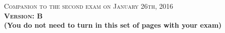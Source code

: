\documentclass{docist}
\begin{document}
\thispagestyle{empty}

\begin{center}
  {\Large \textsc{Companion to the second exam on January 26th, 2016\\[2ex]
  \textbf{Version: B}\\[2ex]}}
  {\normalsize  \textbf{(You do not need to turn in this set of pages with your exam)}}
\end{center}




\qSOAPipesFiltersTwo


\qAllocationTwoOne


\qnginxTwo


\qContinousIntegrationViewsTwo


\qInfinispanViewsTwo


\qWebTwoTwo


\qMicroservicesArchitectureTwo


\qAmazonTwo


\qScalableArchitectureTwo


\qGraphiteScenarioTacticsTwo


\qGraphiteViewsTwo


\qArchitectureInfluenceCycleTwo


\qRequirementsTwo


\qArchitectureDefinitionTwo


\qAdventureBuilderTwo

\end{document}
